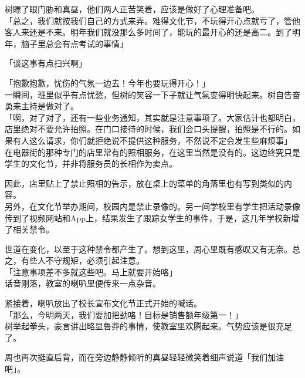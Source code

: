 树瞟了眼门胁和真昼，他们两人正苦笑着，应该是做好了心理准备吧。\\

「总之，我们就按我们自己的方式来弄。难得文化节，不玩得开心点就亏了，管他客人来还是不来。明年我们就没那么多时间了，能玩的最开心的还是高二。到了明年，脑子里总会有点考试的事情」

「谈这事有点扫兴啊」

「抱歉抱歉，忧伤的气氛一边去！今年也要玩得开心！」\\

一瞬间，班里似乎有点忧愁，但树的笑容一下子就让气氛变得明快起来。树自告奋勇来主持是做对了。\\

「啊，对了对了，还有一些业务通知，其实就是注意事项了。大家估计也都明白，店里绝对不要允许拍照。在门口接待的时候，我们会口头提醒，拍照是不行的。如果有人这么请求，你们就拒绝说不提供这种服务，不然说不定会发生些麻烦事」\\

在电器街的那种专门的店里常有的照相服务，在这里当然是没有的。这边终究只是学生的文化节，并非将服务员的长相作为卖点。

因此，店里贴上了禁止照相的告示，放在桌上的菜单的角落里也有写到类似的内容。\\

另外，在文化节举办期间，校园内是禁止录像的。另一间学校里有学生把活动录像传到了视频网站和App上，结果发生了跟踪女学生的事件，于是，这几年学校新增了相关禁令。

世道在变化，以至于这种禁令都产生了。想到这里，周心里既有感叹又有无奈。总之，有些人不守规矩，必须引起注意。\\

「注意事项差不多就这些吧。马上就要开始咯」\\

话音刚落，教室的喇叭里便传来一点杂音。

紧接着，喇叭放出了校长宣布文化节正式开始的喊话。\\

「那么，今明两天，我们要加把劲咯！目标是销售额年级第一！」\\

树举起拳头，豪言讲出略显鲁莽的事情，使教室里欢腾起来。气势应该是很充足了。

周也再次挺直后背，而在旁边静静倾听的真昼轻轻微笑着细声说道「我们加油吧」。
